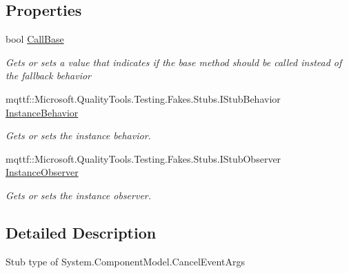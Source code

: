 \subsection*{Properties}
\begin{DoxyCompactItemize}
\item 
bool \hyperlink{class_system_1_1_component_model_1_1_fakes_1_1_stub_cancel_event_args_aca7dd7a17b868613743e4b709ea73054}{Call\-Base}
\begin{DoxyCompactList}\small\item\em Gets or sets a value that indicates if the base method should be called instead of the fallback behavior\end{DoxyCompactList}\item 
mqttf\-::\-Microsoft.\-Quality\-Tools.\-Testing.\-Fakes.\-Stubs.\-I\-Stub\-Behavior \hyperlink{class_system_1_1_component_model_1_1_fakes_1_1_stub_cancel_event_args_a61c28c0a7d3b25a4bde571ca2004d962}{Instance\-Behavior}
\begin{DoxyCompactList}\small\item\em Gets or sets the instance behavior.\end{DoxyCompactList}\item 
mqttf\-::\-Microsoft.\-Quality\-Tools.\-Testing.\-Fakes.\-Stubs.\-I\-Stub\-Observer \hyperlink{class_system_1_1_component_model_1_1_fakes_1_1_stub_cancel_event_args_a04520de7af13af15c4e4170b23c93f5b}{Instance\-Observer}
\begin{DoxyCompactList}\small\item\em Gets or sets the instance observer.\end{DoxyCompactList}\end{DoxyCompactItemize}


\subsection{Detailed Description}
Stub type of System.\-Component\-Model.\-Cancel\-Event\-Args



